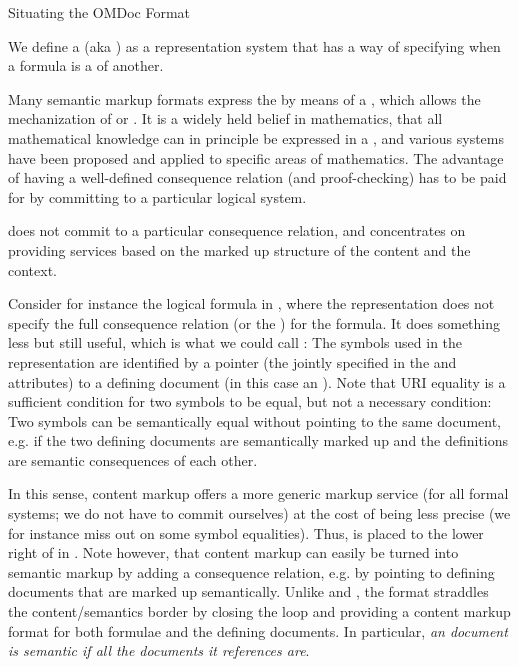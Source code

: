 \begin{omgroup}[id=omdoc-markup,short=Open Mathematical Documents]
\begin{module}[id=situating-OMDoc]
\begin{omgroup}{Situating the OMDoc Format}
\begin{definition}[display=flow]
  We define a {} (aka {}) as a
  representation system that has a way of specifying when a formula is a
  {} of another.
\end{definition}
Many semantic markup formats express the {} by means of a
{}, which allows the mechanization of
{} or {}. It is a widely held belief
in mathematics, that all mathematical knowledge can in principle be expressed in a
{}, and various systems have been proposed and applied to specific
areas of mathematics. The advantage of having a well-defined consequence relation (and
proof-checking) has to be paid for by committing to a particular logical system.

\begin{definition}[display=flow] {} does not commit to a
  particular consequence relation, and concentrates on providing services based on the
  marked up structure of the content and the context.
\end{definition}
Consider for instance the logical formula in {}, where the {\openmath}
representation does not specify the full consequence relation (or the
{}) for the formula. It does something less but still useful,
which is what we could call {\emph{}}: The symbols used in the
representation are identified by a pointer (the {} jointly specified in the
{} and {} attributes) to a
defining document (in this case an {\openmath} {}). Note that
URI equality is a sufficient condition for two symbols to be equal, but not a necessary
condition: Two symbols can be semantically equal without pointing to the same document,
e.g.  if the two defining documents are semantically marked up and the definitions are
semantic consequences of each other.

In this sense, content markup offers a more generic markup service (for all formal
systems; we do not have to commit ourselves) at the cost of being less precise (we for
instance miss out on some symbol equalities). Thus, {} is placed
to the lower right of {} in {}.  Note
however, that content markup can easily be turned into semantic markup by adding a
consequence relation, e.g. by pointing to defining documents that are marked up
semantically.  Unlike {\openmath} and {\cmathml}, the {\omdoc} format straddles the
content/semantics border by closing the loop and providing a content markup format for
both formulae and the defining documents. In particular, {\emph{an {\omdoc} document is
    semantic if all the documents it references are}}.


\end{omgroup}
\end{module}
\end{omgroup}
